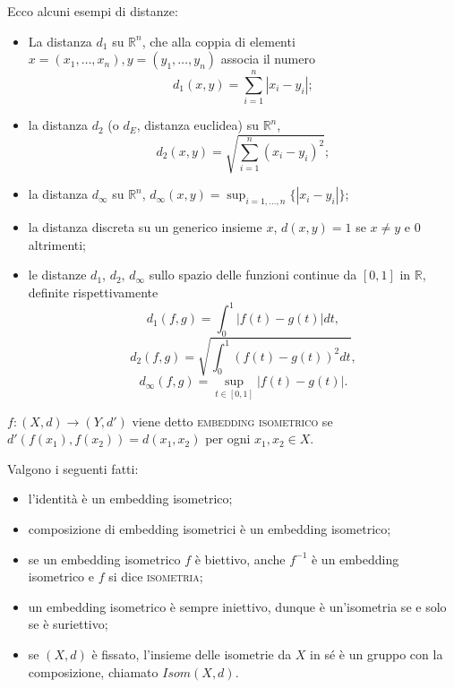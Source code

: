 \documentclass{article}
\begin{document}
\begin{ex}
    Ecco alcuni esempi di distanze:
    \begin{itemize}
        \item La distanza $d_1$ su $\mathbb{R}^n$, che alla coppia di elementi
        ${x=(x_1, \dots, x_n)}, {y=(y_1, \dots, y_n)}$ associa il numero
        $${\displaystyle d_1(x, y)=\sum_{i=1}^n |x_i-y_i|};$$
        \item la distanza $d_2$ (o $d_E$, distanza euclidea) su $\mathbb{R}^n$,
        $$\displaystyle d_2(x, y)=\sqrt{\sum_{i=1}^n (x_i-y_i)^2};$$
        \item la distanza $d_{\infty}$ su $\mathbb{R}^n$, ${\displaystyle
        d_{\infty}(x, y)=\sup_{i=1, \dots, n} \{ |x_i-y_i| \}}$;
        \item
        la distanza discreta su un generico insieme $x$, $d(x, y)=1$ se $x \not=
        y$ e $0$ altrimenti;
        \item le distanze $d_1$, $d_2$, $d_{\infty}$ sullo spazio delle funzioni
        continue da $[0, 1]$ in $\mathbb{R}$, definite rispettivamente
        $${\displaystyle d_1(f, g)=\int_0^1 |f(t)-g(t)| dt},$$
        $${\displaystyle d_2(f, g)=\sqrt{\int_0^1 (f(t)-g(t))^2 dt}},$$
        $${\displaystyle d_{\infty}(f, g)=\sup_{t \in [0, 1]} |f(t)-g(t)|}.$$
    \end{itemize}
\end{ex}

\begin{defn}
	$f:(X, d) \rightarrow (Y, d')$ viene detto \textsc{embedding isometrico} se
	$d'(f(x_1), f(x_2))=d(x_1, x_2)$ per ogni $x_1, x_2 \in X$.
\end{defn}

\begin{oss}
    Valgono i seguenti fatti:
    \begin{itemize}
        \item l'identità è un embedding isometrico;
        \item composizione di embedding isometrici è un embedding isometrico;
        \item se un embedding isometrico $f$ è biettivo, anche $f^{-1}$ è un
        embedding isometrico e $f$ si dice \textsc{isometria};
        \item un embedding isometrico è sempre iniettivo, dunque è un'isometria
        se e solo se è suriettivo;
        \item se $(X, d)$ è fissato, l'insieme delle isometrie da $X$ in sé è un
        gruppo con la composizione, chiamato $Isom(X,d)$.
    \end{itemize}
\end{oss}
\end{document}
